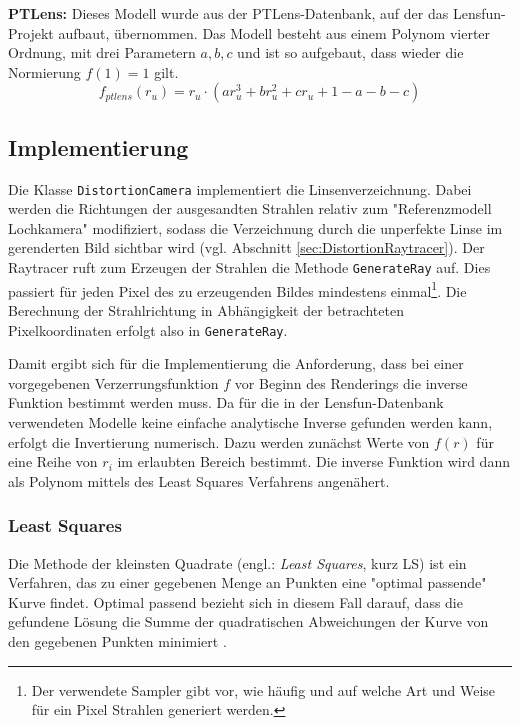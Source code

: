 \textbf{PTLens:} Dieses Modell wurde aus der PTLens-Datenbank, auf der das Lensfun-Projekt aufbaut, übernommen. Das Modell besteht aus einem Polynom vierter Ordnung, mit drei Parametern $a,b,c$ und ist so aufgebaut, dass wieder die Normierung $f(1) = 1$ gilt.
\begin{equation}
	f_{ptlens}(r_u) = r_u \cdot (a r_u^3 + b r_u^2 + c r_u + 1 - a - b - c)
\end{equation}

\subsection{Implementierung}\label{subsec:implementation}

Die Klasse \texttt{DistortionCamera} implementiert die Linsenverzeichnung. Dabei werden die Richtungen der ausgesandten Strahlen relativ zum "Referenzmodell Lochkamera" modifiziert, sodass die Verzeichnung durch die unperfekte Linse im gerenderten Bild sichtbar wird (vgl. Abschnitt \ref{sec:DistortionRaytracer}). Der Raytracer ruft zum Erzeugen der Strahlen die Methode \texttt{GenerateRay} auf. Dies passiert für jeden Pixel des zu erzeugenden Bildes mindestens einmal\footnote{Der verwendete Sampler gibt vor, wie häufig und auf welche Art und Weise für ein Pixel Strahlen generiert werden.}. Die Berechnung der Strahlrichtung in Abhängigkeit der betrachteten Pixelkoordinaten erfolgt also in \texttt{GenerateRay}.

Damit ergibt sich für die Implementierung die Anforderung, dass bei einer vorgegebenen Verzerrungsfunktion $f$ vor Beginn des Renderings die inverse Funktion bestimmt werden muss. Da für die in der Lensfun-Datenbank verwendeten Modelle keine einfache analytische Inverse gefunden werden kann, erfolgt die Invertierung numerisch. Dazu werden zunächst Werte von $f(r)$ für eine Reihe von $r_i$ im erlaubten Bereich bestimmt. Die inverse Funktion wird dann als Polynom mittels des Least Squares Verfahrens angenähert.


\subsubsection{Least Squares}
\label{subsubsec:least}

Die Methode der kleinsten Quadrate (engl.: \emph{Least Squares}, kurz LS) ist ein Verfahren, das zu einer gegebenen Menge an Punkten eine "optimal passende" Kurve findet. Optimal passend bezieht sich in diesem Fall darauf, dass die gefundene Lösung die Summe der quadratischen Abweichungen der Kurve von den gegebenen Punkten minimiert \cite{lsq_wolfram}.

